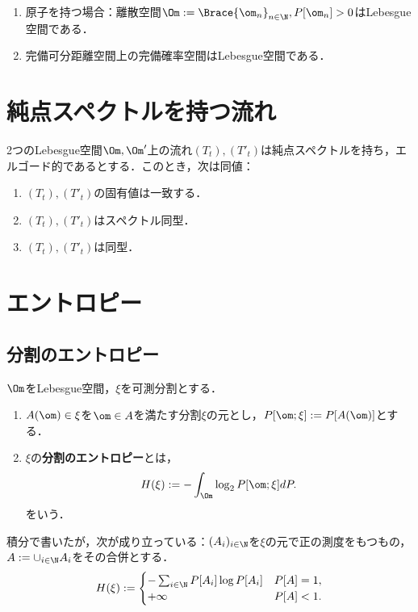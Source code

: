 \documentclass[uplatex,dvipdfmx]{jsreport}
\begin{document}
\begin{example}\mbox{}
    \begin{enumerate}
        \item 原子を持つ場合：離散空間$\Om:=\Brace{\om_n}_{n\in\N},P[\om_n]>0$はLebesgue空間である．
        \item 完備可分距離空間上の完備確率空間はLebesgue空間である．
    \end{enumerate}
\end{example}



\section{純点スペクトルを持つ流れ}

\begin{theorem}
    2つのLebesgue空間$\Om,\Om'$上の流れ$(T_t),(T'_t)$は純点スペクトルを持ち，エルゴード的であるとする．このとき，次は同値：
    \begin{enumerate}
        \item $(T_t),(T'_t)$の固有値は一致する．
        \item $(T_t),(T'_t)$はスペクトル同型．
        \item $(T_t),(T'_t)$は同型．
    \end{enumerate}
\end{theorem}

\section{エントロピー}

\subsection{分割のエントロピー}

\begin{definition}
    $\Om$をLebesgue空間，$\xi$を可測分割とする．
    \begin{enumerate}
        \item $A(\om)\in\xi$を$\om\in A$を満たす分割$\xi$の元とし，$P[\om;\xi]:=P[A(\om)]$とする．
        \item $\xi$の\textbf{分割のエントロピー}とは，
        \[H(\xi):=-\int_\Om\log_2 P[\om;\xi]dP.\]
        をいう．
    \end{enumerate}
\end{definition}
\begin{remarks}
    積分で書いたが，次が成り立っている：$(A_i)_{i\in\N}$を$\xi$の元で正の測度をもつもの，$A:=\cup_{i\in\N}A_i$をその合併とする．
    \[H(\xi):=\begin{cases}
        -\sum_{i\in\N}P[A_i]\log P[A_i]&P[A]=1,\\
        +\infty&P[A]<1.
    \end{cases}\]
\end{remarks}
\end{document}
